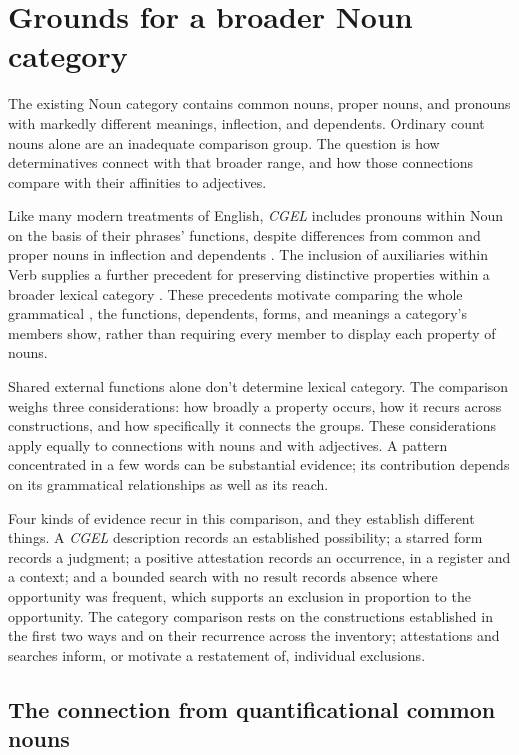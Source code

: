 \documentclass[12pt]{article}
\begin{document}
\section{Grounds for a broader Noun category}\label{sec:proposal}

The existing Noun category contains common nouns, proper nouns, and pronouns with markedly different meanings, inflection, and dependents. Ordinary count nouns alone are an inadequate comparison group. The question is how determinatives connect with that broader range, and how those connections compare with their affinities to adjectives.

Like many modern treatments of English, \textit{CGEL} includes pronouns within Noun on the basis of their phrases' functions, despite differences from common and proper nouns in inflection and dependents \citep[327--328]{huddleston2002}. The inclusion of auxiliaries within Verb supplies a further precedent for preserving distinctive properties within a broader lexical category \citep{pullumwilson1977}. These precedents motivate comparing the whole grammatical , the functions, dependents, forms, and meanings a category's members show, rather than requiring every member to display each property of nouns.

Shared external functions alone don't determine lexical category. The comparison weighs three considerations: how broadly a property occurs, how it recurs across constructions, and how specifically it connects the groups. These considerations apply equally to connections with nouns and with adjectives. A pattern concentrated in a few words can be substantial evidence; its contribution depends on its grammatical relationships as well as its reach.

Four kinds of evidence recur in this comparison, and they establish different things. A \textit{CGEL} description records an established possibility; a starred form records a judgment; a positive attestation records an occurrence, in a register and a context; and a bounded search with no result records absence where opportunity was frequent, which supports an exclusion in proportion to the opportunity. The category comparison rests on the constructions established in the first two ways and on their recurrence across the inventory; attestations and searches inform, or motivate a restatement of, individual exclusions.

\subsection{The connection from quantificational common nouns}\label{sec:quant-nouns}
\end{document}
